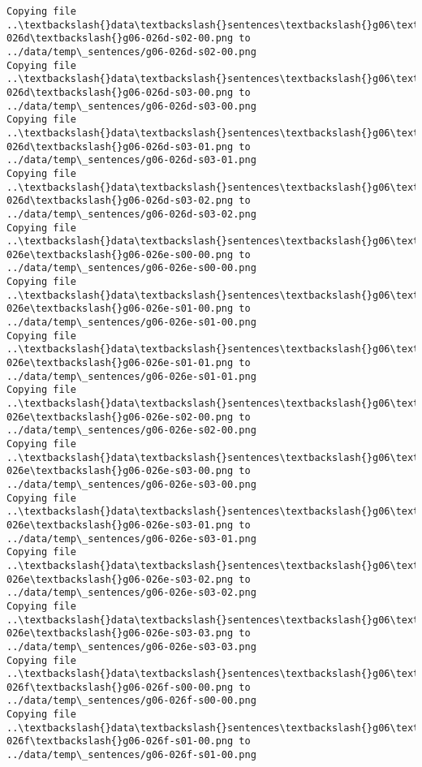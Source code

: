 \documentclass[11pt]{article}
\begin{document}
\begin{Verbatim}[commandchars=\\\{\}]
Copying file ..\textbackslash{}data\textbackslash{}sentences\textbackslash{}g06\textbackslash{}g06-026d\textbackslash{}g06-026d-s02-00.png to
../data/temp\_sentences/g06-026d-s02-00.png
Copying file ..\textbackslash{}data\textbackslash{}sentences\textbackslash{}g06\textbackslash{}g06-026d\textbackslash{}g06-026d-s03-00.png to
../data/temp\_sentences/g06-026d-s03-00.png
Copying file ..\textbackslash{}data\textbackslash{}sentences\textbackslash{}g06\textbackslash{}g06-026d\textbackslash{}g06-026d-s03-01.png to
../data/temp\_sentences/g06-026d-s03-01.png
Copying file ..\textbackslash{}data\textbackslash{}sentences\textbackslash{}g06\textbackslash{}g06-026d\textbackslash{}g06-026d-s03-02.png to
../data/temp\_sentences/g06-026d-s03-02.png
Copying file ..\textbackslash{}data\textbackslash{}sentences\textbackslash{}g06\textbackslash{}g06-026e\textbackslash{}g06-026e-s00-00.png to
../data/temp\_sentences/g06-026e-s00-00.png
Copying file ..\textbackslash{}data\textbackslash{}sentences\textbackslash{}g06\textbackslash{}g06-026e\textbackslash{}g06-026e-s01-00.png to
../data/temp\_sentences/g06-026e-s01-00.png
Copying file ..\textbackslash{}data\textbackslash{}sentences\textbackslash{}g06\textbackslash{}g06-026e\textbackslash{}g06-026e-s01-01.png to
../data/temp\_sentences/g06-026e-s01-01.png
Copying file ..\textbackslash{}data\textbackslash{}sentences\textbackslash{}g06\textbackslash{}g06-026e\textbackslash{}g06-026e-s02-00.png to
../data/temp\_sentences/g06-026e-s02-00.png
Copying file ..\textbackslash{}data\textbackslash{}sentences\textbackslash{}g06\textbackslash{}g06-026e\textbackslash{}g06-026e-s03-00.png to
../data/temp\_sentences/g06-026e-s03-00.png
Copying file ..\textbackslash{}data\textbackslash{}sentences\textbackslash{}g06\textbackslash{}g06-026e\textbackslash{}g06-026e-s03-01.png to
../data/temp\_sentences/g06-026e-s03-01.png
Copying file ..\textbackslash{}data\textbackslash{}sentences\textbackslash{}g06\textbackslash{}g06-026e\textbackslash{}g06-026e-s03-02.png to
../data/temp\_sentences/g06-026e-s03-02.png
Copying file ..\textbackslash{}data\textbackslash{}sentences\textbackslash{}g06\textbackslash{}g06-026e\textbackslash{}g06-026e-s03-03.png to
../data/temp\_sentences/g06-026e-s03-03.png
Copying file ..\textbackslash{}data\textbackslash{}sentences\textbackslash{}g06\textbackslash{}g06-026f\textbackslash{}g06-026f-s00-00.png to
../data/temp\_sentences/g06-026f-s00-00.png
Copying file ..\textbackslash{}data\textbackslash{}sentences\textbackslash{}g06\textbackslash{}g06-026f\textbackslash{}g06-026f-s01-00.png to
../data/temp\_sentences/g06-026f-s01-00.png

\end{Verbatim}
\end{document}

